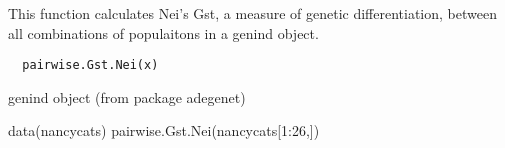 \documentclass[letterpaper]{book}
\begin{document}
%
\begin{Description}\relax
This function calculates Nei's Gst, a measure of genetic
differentiation, between all combinations of populaitons
in a genind object.
\end{Description}
%
\begin{Usage}
\begin{verbatim}
  pairwise.Gst.Nei(x)
\end{verbatim}
\end{Usage}
%
\begin{Arguments}
\begin{ldescription}
\item[\code{x}] genind object (from package adegenet)
\end{ldescription}
\end{Arguments}
%
\begin{Examples}
\begin{ExampleCode}
data(nancycats)
pairwise.Gst.Nei(nancycats[1:26,])
\end{ExampleCode}
\end{Examples}
\printindex{}
\end{document}
